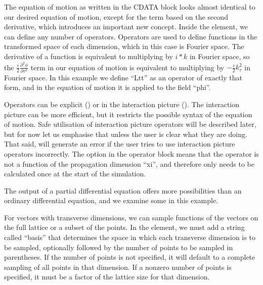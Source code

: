 \documentclass[letterpaper,10pt,english]{sphinxmanual}
\begin{document}
\sphinxAtStartPar
The equation of motion as written in the CDATA block looks almost identical to our desired equation of motion, except for the term based on the second derivative, which introduces an important new concept.  Inside the  element, we can define any number of operators.  Operators are used to define functions in the transformed space of each dimension, which in this case is Fourier space.  The derivative of a function is equivalent to multiplying by \(i*k\) in Fourier space, so the \(\frac{i}{2}\frac{\partial^2 \phi}{\partial \tau^2}\) term in our equation of motion is equivalent to multiplying by \(-\frac{i}{2}k_\tau^2\) in Fourier space.  In this example we define “Ltt” as an operator of exactly that form, and in the equation of motion it is applied to the field “phi”.

\sphinxAtStartPar
Operators can be explicit () or in the interaction picture ().  The interaction picture can be more efficient, but it restricts the possible syntax of the equation of motion.  Safe utilisation of interaction picture operators will be described later, but for now let us emphasise that  unless the user is clear what they are doing.  That said,  will generate an error if the user tries to use interaction picture operators incorrectly.  The  option in the operator block means that the operator is not a function of the propagation dimension “xi”, and therefore only needs to be calculated once at the start of the simulation.

\sphinxAtStartPar
The output of a partial differential equation offers more possibilities than an ordinary differential equation, and we examine some in this example.

\sphinxAtStartPar
For vectors with transverse dimensions, we can sample functions of the vectors on the full lattice or a subset of the points.  In the  element, we must add a string called “basis” that determines the space in which each transverse dimension is to be sampled, optionally followed by the number of points to be sampled in parentheses.  If the number of points is not specified, it will default to a complete sampling of all points in that dimension.  If a non\sphinxhyphen{}zero number of points is specified, it must be a factor of the lattice size for that dimension.
\end{document}
